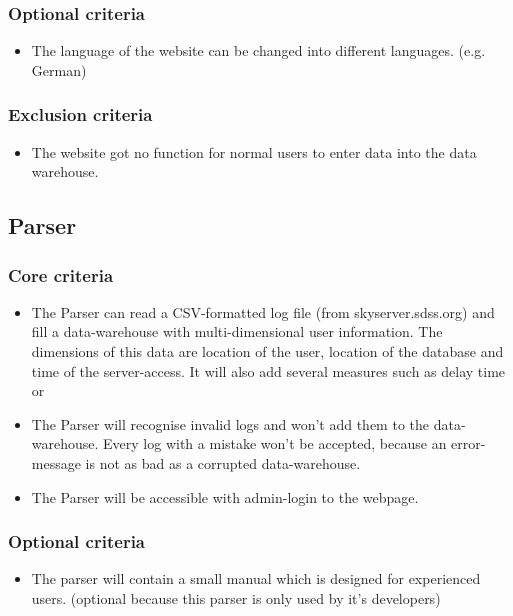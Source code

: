 \subsubsection{Optional criteria}
\begin{itemize}
\item The language of the website can be changed into different languages. (e.g. German)
\end{itemize}

\subsubsection{Exclusion criteria}
\begin{itemize}
\item The website got no function for normal users to enter data into the data warehouse.
\end{itemize}

\subsection{Parser}

\subsubsection{Core criteria} %
\begin{itemize}
\item The Parser can read a CSV-formatted log file (from skyserver.sdss.org)
 and fill a data-warehouse with multi-dimensional user information.
 The dimensions of this data are location of the user, location of the 
 database and time of the server-access. It will also add several measures such as delay time or  
\item The Parser will recognise invalid logs and won't add them to the data-warehouse.
 Every log with a mistake won't be accepted, because an error-message is not 
 as bad as a corrupted data-warehouse. 
\item The Parser will be accessible with admin-login to the webpage.
\end{itemize} 

\subsubsection{Optional criteria}
\begin{itemize}
\item The parser will contain a small manual which is designed for experienced users. 
(optional because this parser is only used by it's developers)
\end{itemize}

